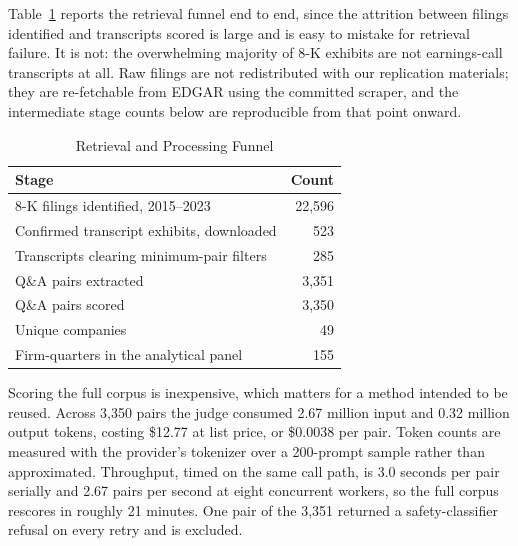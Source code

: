 \documentclass[conference]{IEEEtran}
\begin{document}
Table~\ref{tab:funnel} reports the retrieval funnel end to end, since the
attrition between filings identified and transcripts scored is large and is
easy to mistake for retrieval failure. It is not: the overwhelming majority of
8-K exhibits are not earnings-call transcripts at all. Raw filings are not
redistributed with our replication materials; they are re-fetchable from EDGAR
using the committed scraper, and the intermediate stage counts below are
reproducible from that point onward.

\begin{table}[t]
\centering
\caption{Retrieval and Processing Funnel}
\label{tab:funnel}
\begin{tabular}{lr}
\toprule
Stage & Count \\
\midrule
8-K filings identified, 2015--2023 & 22,596 \\
Confirmed transcript exhibits, downloaded & 523 \\
Transcripts clearing minimum-pair filters & 285 \\
Q\&A pairs extracted & 3,351 \\
Q\&A pairs scored & 3,350 \\
Unique companies & 49 \\
Firm-quarters in the analytical panel & 155 \\
\bottomrule
\end{tabular}
\end{table}

Scoring the full corpus is inexpensive, which matters for a method intended to
be reused. Across 3,350 pairs the judge consumed 2.67 million input and 0.32
million output tokens, costing \$12.77 at list price, or \$0.0038 per pair.
Token counts are measured with the provider's tokenizer over a 200-prompt
sample rather than approximated. Throughput, timed on the same call path, is
3.0 seconds per pair serially and 2.67 pairs per second at eight concurrent
workers, so the full corpus rescores in roughly 21 minutes. One pair of the
3,351 returned a safety-classifier refusal on every retry and is excluded.
\end{document}
